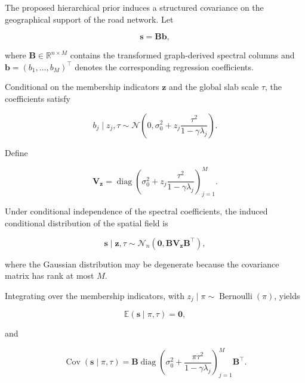 \documentclass[11pt]{article}
\begin{document}
The proposed hierarchical prior induces a structured covariance 
on the geographical support of the road network. Let

\begin{equation}
	\mathbf{s} = \mathbf{B}\mathbf{b},
\end{equation}

where $\mathbf{B}\in\mathbb{R}^{n\times M}$ contains the 
transformed graph-derived spectral columns and
$\mathbf{b}=(b_1,\ldots,b_M)^\top$ denotes the corresponding 
regression coefficients.

Conditional on the membership indicators $\mathbf{z}$ and 
the global slab scale $\tau$, the coefficients satisfy

\begin{equation}
	b_j \mid z_j,\tau
	\sim
	\mathcal{N}\left(
	0,
	\sigma_0^2+
	z_j\frac{\tau^2}{1-\gamma\lambda_j}
	\right).
\end{equation}

Define

\begin{equation}
	\mathbf{V}_{\mathbf{z}}
	=
	\operatorname{diag}\left(
	\sigma_0^2+
	z_j\frac{\tau^2}{1-\gamma\lambda_j}
	\right)_{j=1}^{M}.
\end{equation}

Under conditional independence of the spectral coefficients,
the induced conditional distribution of the spatial field is

\begin{equation}
	\mathbf{s}\mid\mathbf{z},\tau
	\sim
	\mathcal{N}_n\left(
	\mathbf{0},
	\mathbf{B}\mathbf{V}_{\mathbf{z}}\mathbf{B}^{\top}
	\right),
\end{equation}

where the Gaussian distribution may be degenerate because 
the covariance matrix has rank at most $M$.

Integrating over the membership indicators, with
$z_j\mid\pi\sim\operatorname{Bernoulli}(\pi)$, yields

\begin{equation}
	\mathbb{E}(\mathbf{s}\mid\pi,\tau)
	=
	\mathbf{0},
\end{equation}

and

\begin{equation}
	\operatorname{Cov}(\mathbf{s}\mid\pi,\tau)
	=
	\mathbf{B}
	\operatorname{diag}\left(
	\sigma_0^2+
	\frac{\pi\tau^2}{1-\gamma\lambda_j}
	\right)_{j=1}^{M}
	\mathbf{B}^{\top}.
	\label{eq:induced_covariance}
\end{equation}
\end{document}
